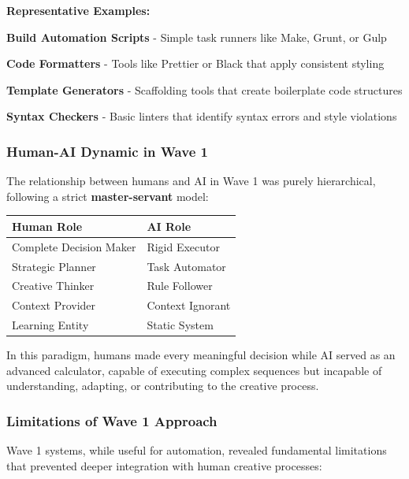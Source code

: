 \textbf{Representative Examples:}

\begin{compactlist}
    \item \textbf{Build Automation Scripts} - Simple task runners like Make, Grunt, or Gulp
    \item \textbf{Code Formatters} - Tools like Prettier or Black that apply consistent styling
    \item \textbf{Template Generators} - Scaffolding tools that create boilerplate code structures
    \item \textbf{Syntax Checkers} - Basic linters that identify syntax errors and style violations
\end{compactlist}

\subsubsection{Human-AI Dynamic in Wave 1}

The relationship between humans and AI in Wave 1 was purely hierarchical, following a strict \textbf{master-servant} model:

\begin{center}
\begin{tabular}{@{}ll@{}}
\toprule
\textbf{Human Role} & \textbf{AI Role} \\
\midrule
Complete Decision Maker & Rigid Executor \\
Strategic Planner & Task Automator \\
Creative Thinker & Rule Follower \\
Context Provider & Context Ignorant \\
Learning Entity & Static System \\
\bottomrule
\end{tabular}
\label{tab:wave1-relationship}
\end{center}

In this paradigm, humans made every meaningful decision while AI served as an advanced calculator, capable of executing complex sequences but incapable of understanding, adapting, or contributing to the creative process.

\subsubsection{Limitations of Wave 1 Approach}

Wave 1 systems, while useful for automation, revealed fundamental limitations that prevented deeper integration with human creative processes:

